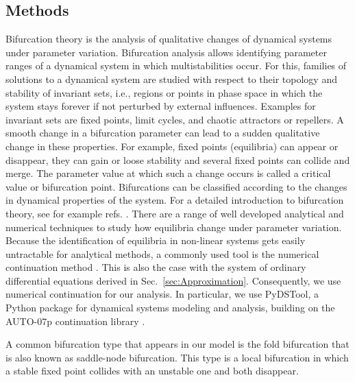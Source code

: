 \subsection{Methods}
Bifurcation theory is the analysis of qualitative changes of dynamical systems under parameter variation.
Bifurcation analysis allows identifying parameter ranges of a dynamical system in which multistabilities occur.
For this, families of solutions to a dynamical system are studied with respect to their topology and stability of invariant sets, i.e., regions or points in phase space in which the system stays forever if not perturbed by external influences.
Examples for invariant sets are fixed points, limit cycles, and chaotic attractors or repellers.
A smooth change in a bifurcation parameter can lead to a sudden qualitative change in these properties. For example, fixed points (equilibria) can appear or disappear, they can gain or loose stability and several fixed points can collide and merge.
The parameter value at which such a change occurs is called a critical value or bifurcation point. Bifurcations can be classified according to the changes in dynamical properties of the system.
For a detailed introduction to bifurcation theory, see for example refs. \cite{Strogatz1994,Kuznetsov1998}.
There are a range of well developed analytical and numerical techniques to study how equilibria change under parameter variation. Because the identification of equilibria in non-linear systems gets easily untractable for analytical methods, a commonly used tool is the numerical continuation method \citep{Allgower2003}.
This is also the case with the system of ordinary differential equations derived in Sec.~\ref{sec:Approximation}. Consequently, we use numerical continuation for our analysis. In particular, we use PyDSTool, a Python package for dynamical systems modeling and analysis, \cite{pydstool,10.1371/journal.pcbi.1002628} building on the AUTO-07p continuation library \cite{Doedel07auto-07p:continuation}.

A common bifurcation type that appears in our model is the fold bifurcation that is also known as saddle-node bifurcation. This type is a local bifurcation in which a stable fixed point collides with an unstable one and both disappear. 

